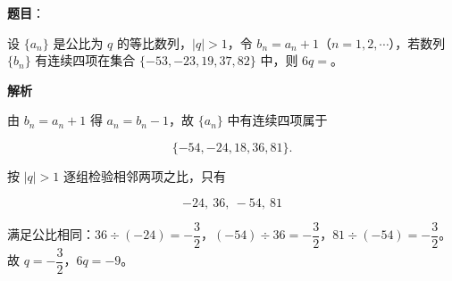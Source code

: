 \begin{answer}

\textbf{题目}：

设 $\{a_n\}$ 是公比为 $q$ 的等比数列，$|q|>1$，令 $b_n=a_n+1$（$n=1,2,\cdots$），若数列 $\{b_n\}$ 有连续四项在集合 $\{-53,-23,19,37,82\}$ 中，则 $6q=$\gkblank{}。

\textbf{解析}

由 $b_n=a_n+1$ 得 $a_n=b_n-1$，故 $\{a_n\}$ 中有连续四项属于

\nopagebreak[4]
\[\{-54,-24,18,36,81\}.\]

按 $|q|>1$ 逐组检验相邻两项之比，只有

\nopagebreak[4]
\[-24,\ 36,\ -54,\ 81\]

满足公比相同：$36\div(-24)=-\dfrac32$，$(-54)\div36=-\dfrac32$，$81\div(-54)=-\dfrac32$。故 $q=-\dfrac32$，$6q=-9$。


\end{answer}
